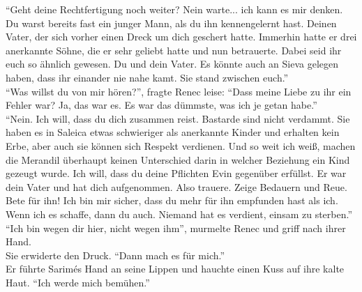 ``Geht deine Rechtfertigung noch weiter? Nein warte... ich kann es mir denken. Du warst bereits 
fast ein junger Mann, als du ihn kennengelernt hast. Deinen Vater, der sich vorher einen Dreck um 
dich geschert hatte. Immerhin hatte er drei anerkannte Söhne, die er sehr geliebt hatte und nun 
betrauerte. Dabei seid ihr euch so ähnlich gewesen. Du und dein Vater. Es könnte auch an Sieva 
gelegen haben, dass ihr einander nie nahe kamt. Sie stand zwischen euch.''\\
``Was willst du von mir hören?'', fragte Renec leise: ``Dass meine Liebe zu ihr ein Fehler war? Ja, 
das war es. Es war das dümmste, was ich je getan habe.''\\
``Nein. Ich will, dass du dich zusammen reist. Bastarde sind nicht verdammt. Sie haben es in 
Saleica etwas schwieriger als anerkannte Kinder und erhalten kein Erbe, aber auch sie können sich 
Respekt verdienen. Und so weit ich weiß, machen die Merandil überhaupt keinen Unterschied darin in 
welcher Beziehung ein Kind gezeugt wurde. Ich will, dass du deine Pflichten Evin gegenüber 
erfüllst. Er war dein Vater und hat dich aufgenommen. Also trauere. Zeige Bedauern und Reue. Bete 
für ihn! Ich bin mir sicher, dass du mehr für ihn empfunden hast als ich. Wenn ich es schaffe, dann 
du auch. Niemand hat es verdient, einsam zu sterben.''\\
``Ich bin wegen dir hier, nicht wegen ihm'', murmelte Renec und griff nach ihrer Hand.\\
Sie erwiderte den Druck. ``Dann mach es für mich.''\\
Er führte Sarimés Hand an seine Lippen und hauchte einen Kuss auf ihre kalte Haut. ``Ich werde mich 
bemühen.''\\


